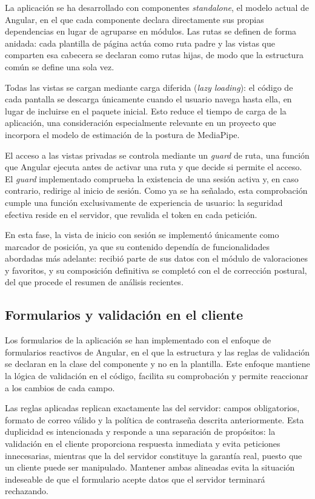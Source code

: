 \documentclass[12pt,a4paper,twoside,openright]{book}
\begin{document}
    La aplicación se ha desarrollado con componentes \textit{standalone}, el
    modelo actual de Angular, en el que cada componente declara directamente sus
    propias dependencias en lugar de agruparse en módulos. Las rutas se definen
    de forma anidada: cada plantilla de página actúa como ruta padre y las
    vistas que comparten esa cabecera se declaran como rutas hijas, de modo que
    la estructura común se define una sola vez.

    Todas las vistas se cargan mediante carga diferida (\textit{lazy loading}):
    el código de cada pantalla se descarga únicamente cuando el usuario navega
    hasta ella, en lugar de incluirse en el paquete inicial. Esto reduce el
    tiempo de carga de la aplicación, una consideración especialmente relevante
    en un proyecto que incorpora el modelo de estimación de la postura de MediaPipe.

    El acceso a las vistas privadas se controla mediante un \textit{guard} de
    ruta, una función que Angular ejecuta antes de activar una ruta y que
    decide si permite el acceso. El \textit{guard} implementado comprueba la
    existencia de una sesión activa y, en caso contrario, redirige al inicio de
    sesión. Como ya se ha señalado, esta comprobación cumple una función
    exclusivamente de experiencia de usuario: la seguridad efectiva reside en el
    servidor, que revalida el token en cada petición.

    En esta fase, la vista de inicio con sesión se implementó únicamente como
    marcador de posición, ya que su contenido dependía de funcionalidades
    abordadas más adelante: recibió parte de sus datos con el módulo de
    valoraciones y favoritos, y su composición definitiva se completó con el de
    corrección postural, del que procede el resumen de análisis recientes.

    \subsection{Formularios y validación en el cliente}

    Los formularios de la aplicación se han implementado con el enfoque de
    formularios reactivos de Angular, en el que la estructura y las reglas de
    validación se declaran en la clase del componente y no en la plantilla.
    Este enfoque mantiene la lógica de validación en el código, facilita su
    comprobación y permite reaccionar a los cambios de cada campo.

    Las reglas aplicadas replican exactamente las del servidor: campos
    obligatorios, formato de correo válido y la política de contraseña descrita
    anteriormente. Esta duplicidad es intencionada y responde a una separación
    de propósitos: la validación en el cliente proporciona respuesta inmediata y
    evita peticiones innecesarias, mientras que la del servidor constituye la
    garantía real, puesto que un cliente puede ser manipulado. Mantener ambas
    alineadas evita la situación indeseable de que el formulario acepte datos
    que el servidor terminará rechazando.
\end{document}
